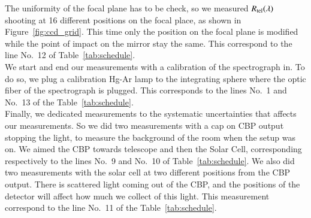 The uniformity of the \SD focal plane has to be check, so we measured $R_{\mathrm{tel}}(\lambda)$ shooting at 16 different positions on the focal place, as shown in Figure~\ref{fig:ccd_grid}. This time only the position on the focal plane is modified while the point of impact on the mirror stay the same. This correspond to the line No.~12 of Table~\ref{tab:schedule}. \\

We start and end our measurements with a calibration of the spectrograph in. To do so, we plug a calibration Hg-Ar  lamp to the integrating sphere where the optic fiber of the spectrograph is plugged. This corresponds to the lines No.~1 and No.~13 of the Table~\ref{tab:schedule}.\\

Finally, we dedicated measurements to the systematic uncertainties that affects our measurements. So we did two measurements with a cap on CBP output stopping the light, to measure the background of the room when the setup was on. We aimed the CBP towards \SD telescope and then the Solar Cell, corresponding respectively to the lines No.~9 and No.~10 of Table~\ref{tab:schedule}. We also did two measurements with the solar cell at two different positions from the CBP output. There is scattered light coming out of the CBP, and the positions of the detector will affect how much we collect of this light. This measurement correspond to the line No.~11 of the Table~\ref{tab:schedule}.

